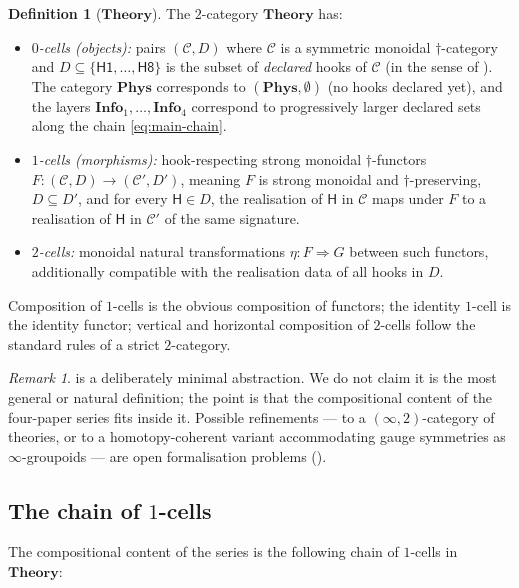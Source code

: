 \documentclass[12pt]{article}
\theoremstyle{definition}
\newtheorem{definition}[theorem]{Definition}
\theoremstyle{remark}
\newtheorem{remark}[theorem]{Remark}
\newcommand{\C}{\mathcal{C}}
\newcommand{\Phys}{\mathbf{Phys}}
\newcommand{\Info}{\mathbf{Info}}
\newcommand{\Theory}{\mathbf{Theory}}
\begin{document}
\begin{definition}[$\Theory$]
\label{def:theory}
The $2$-category $\Theory$ has:
\begin{itemize}[leftmargin=2em]
\item \emph{$0$-cells (objects):} pairs $(\C, D)$ where $\C$ is a
  symmetric monoidal $\dagger$-category and $D \subseteq \{\mathsf{H1},
  \ldots, \mathsf{H8}\}$ is the subset of \emph{declared} hooks of $\C$
  (in the sense of ). The category $\Phys$ corresponds
  to $(\Phys, \emptyset)$ (no hooks declared yet), and the layers
  $\Info_1, \ldots, \Info_4$ correspond to progressively larger declared
  sets along the chain \eqref{eq:main-chain}.
\item \emph{$1$-cells (morphisms):} hook-respecting strong monoidal
  $\dagger$-functors $F : (\C, D) \to (\C', D')$, meaning $F$ is strong
  monoidal and $\dagger$-preserving, $D \subseteq D'$, and for every
  $\mathsf{H} \in D$, the realisation of $\mathsf{H}$ in $\C$ maps under
  $F$ to a realisation of $\mathsf{H}$ in $\C'$ of the same signature.
\item \emph{$2$-cells:} monoidal natural transformations $\eta : F \Rightarrow
  G$ between such functors, additionally compatible with the realisation
  data of all hooks in $D$.
\end{itemize}
Composition of $1$-cells is the obvious composition of functors;
the identity $1$-cell is the identity functor; vertical and horizontal
composition of $2$-cells follow the standard rules of a strict
$2$-category.
\end{definition}

\begin{remark}
 is a deliberately minimal abstraction. We do not claim it
is the most general or natural definition; the point is that the
compositional content of the four-paper series fits inside it. Possible
refinements --- to a $(\infty,2)$-category of theories, or to a
homotopy-coherent variant accommodating gauge symmetries as $\infty$-groupoids
--- are open formalisation problems ().
\end{remark}

\subsection{The chain of $1$-cells}

The compositional content of the series is the following chain of $1$-cells
in $\Theory$:
\end{document}
